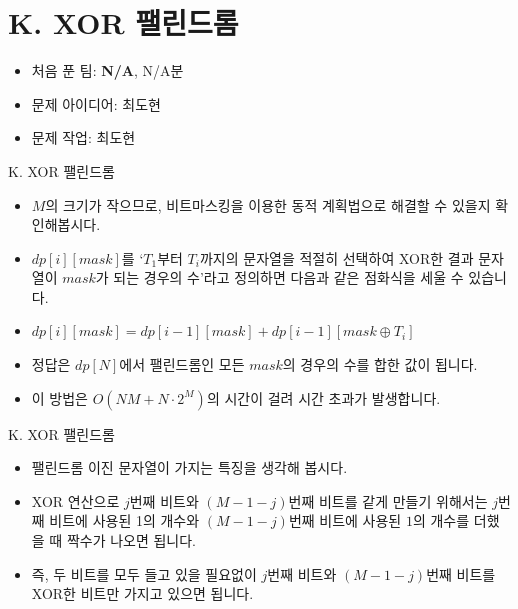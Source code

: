 \def\probno{K}
\def\probtitle{XOR 팰린드롬}

\section{\probno{}. \probtitle{}}

\begin{frame} %
    \sectiontitle{\probno{}}{\probtitle{}}
    \begin{itemize}
        \item 처음 푼 팀: \textbf{N/A}, N/A분
        \item 문제 아이디어: 최도현
        \item 문제 작업: 최도현
    \end{itemize}
\end{frame}

\begin{frame}{\probno{}. \probtitle{}}
    \begin{itemize}
        \item $M$의 크기가 작으므로, 비트마스킹을 이용한 동적 계획법으로 해결할 수 있을지 확인해봅시다.
        \item $dp[i][mask]$를 `$T_1$부터 $T_i$까지의 문자열을 적절히 선택하여 XOR한 결과 문자열이 $mask$가 되는 경우의 수'라고 정의하면 다음과 같은 점화식을 세울 수 있습니다.
        \item $dp[i][mask] = dp[i-1][mask] + dp[i-1][mask \oplus T_i]$
        \item 정답은 $dp[N]$에서 팰린드롬인 모든 $mask$의 경우의 수를 합한 값이 됩니다. 
        \item 이 방법은 $O(NM + N \cdot 2^{M})$의 시간이 걸려 시간 초과가 발생합니다.
    \end{itemize}
\end{frame}

\begin{frame}{\probno{}. \probtitle{}}
    \begin{itemize}
        \item 팰린드롬 이진 문자열이 가지는 특징을 생각해 봅시다.
        \item XOR 연산으로 $j$번째 비트와 $(M-1-j)$번째 비트를 같게 만들기 위해서는 $j$번째 비트에 사용된 1의 개수와 $(M-1-j)$번째 비트에 사용된 $1$의 개수를 더했을 때 짝수가 나오면 됩니다.
        \item 즉, 두 비트를 모두 들고 있을 필요없이 $j$번째 비트와 $(M-1-j)$번째 비트를 XOR한 비트만 가지고 있으면 됩니다.
    \end{itemize}
\end{frame}

